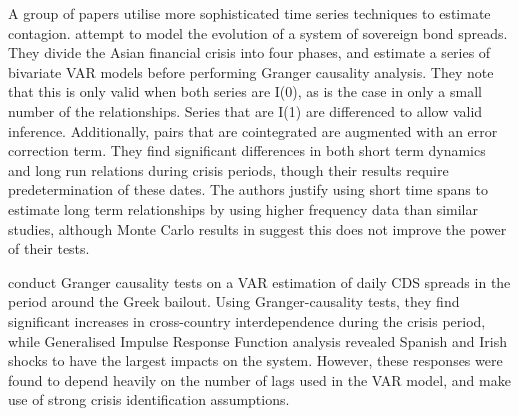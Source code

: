 \documentclass[../base.tex]{subfiles}
\begin{document}
A group of papers utilise more sophisticated time series techniques to estimate contagion. \cite{sander2003contagion} attempt to model the evolution of a system of sovereign bond spreads. They divide the Asian financial crisis into four phases, and estimate a series of bivariate VAR models before performing Granger causality analysis. They note that this is only valid when both series are I(0), as is the case in only a small number of the relationships. Series that are I(1) are differenced to allow valid inference. Additionally, pairs that are cointegrated are augmented with an error correction term. They find significant differences in both short term dynamics and long run relations during crisis periods, though their results require predetermination of these dates. The authors justify using short time spans to estimate long term relationships by using higher frequency data than similar studies, although Monte Carlo results in \cite{pierse1995temporal} suggest this does not improve the power of their tests.

\cite{kalbaska2012eurozone} conduct Granger causality tests on a VAR estimation of daily CDS spreads in the period around the Greek bailout. Using Granger-causality tests, they find significant increases in cross-country interdependence during the crisis period, while Generalised Impulse Response Function analysis revealed Spanish and Irish shocks to have the largest impacts on the system. However, these responses were found to depend heavily on the number of lags used in the VAR model, and make use of strong crisis identification assumptions.
\end{document}
